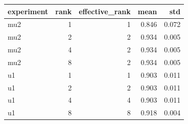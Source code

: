\begin{tabular}{lrrrr}
\toprule
experiment & rank & effective_rank & mean & std \\
\midrule
mu2 & 1 & 1 & 0.846 & 0.072 \\
mu2 & 2 & 2 & 0.934 & 0.005 \\
mu2 & 4 & 2 & 0.934 & 0.005 \\
mu2 & 8 & 2 & 0.934 & 0.005 \\
u1 & 1 & 1 & 0.903 & 0.011 \\
u1 & 2 & 2 & 0.903 & 0.011 \\
u1 & 4 & 4 & 0.903 & 0.011 \\
u1 & 8 & 8 & 0.918 & 0.004 \\
\bottomrule
\end{tabular}
